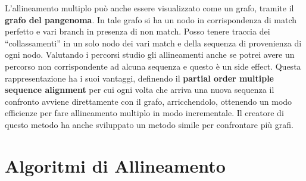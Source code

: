 \documentclass[a4paper,12pt, oneside]{book}
\begin{document}
L'allineamento multiplo può anche essere visualizzato come un grafo, tramite il
\textbf{grafo del pangenoma}. In tale grafo si ha un nodo in corrispondenza di
match perfetto e vari branch in presenza di non match. Posso tenere traccia dei
``collassamenti'' in un solo nodo dei vari match e della sequenza di provenienza
di ogni nodo. Valutando i percorsi studio gli allineamenti anche se potrei avere
un percorso non corrispondente ad alcuna sequenza e questo è un side
effect. Questa rappresentazione ha i suoi vantaggi, definendo il \textbf{partial
order multiple sequence alignment} per cui ogni volta che arriva una nuova
sequenza il confronto avviene direttamente con il grafo, arricchendolo,
ottenendo un modo efficienze per fare allineamento multiplo in modo
incrementale. Il creatore di questo metodo ha anche sviluppato un metodo simile
per confrontare più grafi.
\section{Algoritmi di Allineamento}
\end{document}
